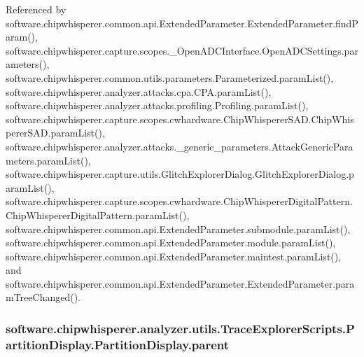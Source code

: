 Referenced by software.\+chipwhisperer.\+common.\+api.\+Extended\+Parameter.\+Extended\+Parameter.\+find\+Param(), software.\+chipwhisperer.\+capture.\+scopes.\+\_\+\+Open\+A\+D\+C\+Interface.\+Open\+A\+D\+C\+Settings.\+parameters(), software.\+chipwhisperer.\+common.\+utils.\+parameters.\+Parameterized.\+param\+List(), software.\+chipwhisperer.\+analyzer.\+attacks.\+cpa.\+C\+P\+A.\+param\+List(), software.\+chipwhisperer.\+analyzer.\+attacks.\+profiling.\+Profiling.\+param\+List(), software.\+chipwhisperer.\+capture.\+scopes.\+cwhardware.\+Chip\+Whisperer\+S\+A\+D.\+Chip\+Whisperer\+S\+A\+D.\+param\+List(), software.\+chipwhisperer.\+analyzer.\+attacks.\+\_\+generic\+\_\+parameters.\+Attack\+Generic\+Parameters.\+param\+List(), software.\+chipwhisperer.\+capture.\+utils.\+Glitch\+Explorer\+Dialog.\+Glitch\+Explorer\+Dialog.\+param\+List(), software.\+chipwhisperer.\+capture.\+scopes.\+cwhardware.\+Chip\+Whisperer\+Digital\+Pattern.\+Chip\+Whisperer\+Digital\+Pattern.\+param\+List(), software.\+chipwhisperer.\+common.\+api.\+Extended\+Parameter.\+submodule.\+param\+List(), software.\+chipwhisperer.\+common.\+api.\+Extended\+Parameter.\+module.\+param\+List(), software.\+chipwhisperer.\+common.\+api.\+Extended\+Parameter.\+maintest.\+param\+List(), and software.\+chipwhisperer.\+common.\+api.\+Extended\+Parameter.\+Extended\+Parameter.\+param\+Tree\+Changed().

\hypertarget{classsoftware_1_1chipwhisperer_1_1analyzer_1_1utils_1_1TraceExplorerScripts_1_1PartitionDisplay_1_1PartitionDisplay_a85e10ae56a0387716134a3877f02a6dd}{}
\subsubsection[{parent}]{\setlength{\rightskip}{0pt plus 5cm}software.\+chipwhisperer.\+analyzer.\+utils.\+Trace\+Explorer\+Scripts.\+Partition\+Display.\+Partition\+Display.\+parent}\label{classsoftware_1_1chipwhisperer_1_1analyzer_1_1utils_1_1TraceExplorerScripts_1_1PartitionDisplay_1_1PartitionDisplay_a85e10ae56a0387716134a3877f02a6dd}


